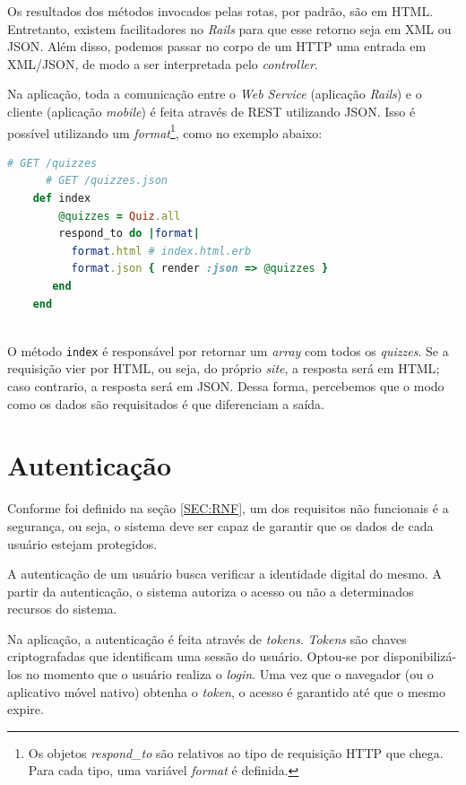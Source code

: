     Os resultados dos métodos invocados pelas rotas, por padrão, são em \ac{HTML}. Entretanto, existem facilitadores no \emph{Rails} para que esse retorno seja em \ac{XML} ou \ac{JSON}. Além disso, podemos passar no corpo de um \ac{HTTP} uma entrada em \ac{XML}/\ac{JSON}, de modo a ser interpretada pelo \emph{controller}.
	
            Na aplicação, toda a comunicação entre o \emph{Web Service} (aplicação \emph{Rails}) e o cliente (aplicação \emph{mobile}) é feita através de \ac{REST} utilizando \ac{JSON}. Isso é possível utilizando um \emph{format}\footnote{Os objetos \emph{respond\_to} são relativos ao tipo de requisição \ac{HTTP} que chega. Para cada tipo, uma variável \emph{format} é definida.}, como no exemplo abaixo:
\begin{lstlisting}[language=Ruby]
    # GET /quizzes
      # GET /quizzes.json
    def index
        @quizzes = Quiz.all
    	respond_to do |format|
          format.html # index.html.erb
          format.json { render :json => @quizzes }
   	   end
    end
     
 \end{lstlisting} 
 
            O método \texttt{index} é responsável por retornar um \emph{array} com todos os \emph{quizzes}. Se a requisição vier por \ac{HTML}, ou seja, do próprio \emph{site}, a resposta será em \ac{HTML}; caso contrario, a resposta será em \ac{JSON}. Dessa forma, percebemos que o modo como os dados são requisitados é que diferenciam a saída.
     
    \section{Autenticação}
            Conforme foi definido na seção \ref{SEC:RNF}, um dos requisitos não funcionais é a segurança, ou seja, o sistema deve ser capaz de garantir que os dados de cada usuário estejam protegidos.
			
            A autenticação de um usuário busca verificar a identidade digital do mesmo. A partir da autenticação, o sistema autoriza o acesso ou não a determinados recursos do sistema.
			
           Na aplicação, a autenticação é feita através de \emph{tokens}. \emph{Tokens} são chaves criptografadas que identificam uma sessão do usuário. Optou-se por disponibilizá-los no momento que o usuário realiza o \emph{login}. Uma vez que o navegador (ou o aplicativo móvel nativo) obtenha o \emph{token}, o acesso é garantido até que o mesmo expire.
			
